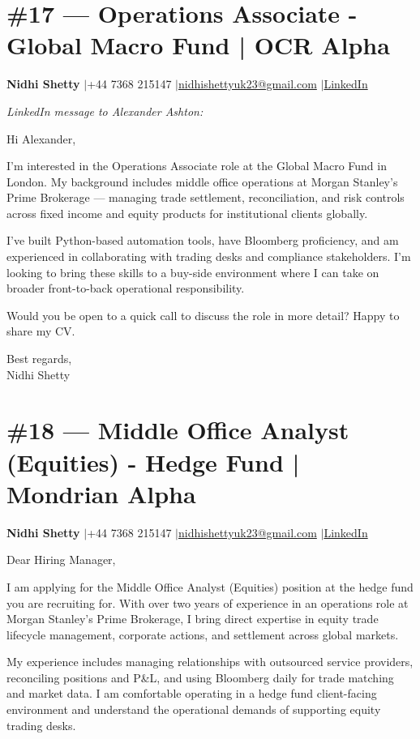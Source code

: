 \documentclass[11pt,a4paper]{article}
\makeatletter
\newcommand{\coverheader}{%
\begin{flushleft}
{\bfseries Nidhi Shetty} \enspace$\vert$\enspace +44 7368 215147 \enspace$\vert$\enspace \href{mailto:nidhishettyuk23@gmail.com}{nidhishettyuk23@gmail.com} \enspace$\vert$\enspace \href{https://www.linkedin.com/in/nidhi-shetty23-1841b7181}{LinkedIn}
\end{flushleft}
\vspace{4pt}
}
\makeatother
\begin{document}
\section{\#17 --- Operations Associate - Global Macro Fund | OCR Alpha}
\coverheader

\textit{LinkedIn message to Alexander Ashton:}

\vspace{6pt}

Hi Alexander,

I'm interested in the Operations Associate role at the Global Macro Fund in London. My background includes middle office operations at Morgan Stanley's Prime Brokerage --- managing trade settlement, reconciliation, and risk controls across fixed income and equity products for institutional clients globally.

I've built Python-based automation tools, have Bloomberg proficiency, and am experienced in collaborating with trading desks and compliance stakeholders. I'm looking to bring these skills to a buy-side environment where I can take on broader front-to-back operational responsibility.

Would you be open to a quick call to discuss the role in more detail? Happy to share my CV.

\vspace{8pt}
Best regards,\\
Nidhi Shetty

\newpage
\section{\#18 --- Middle Office Analyst (Equities) - Hedge Fund | Mondrian Alpha}
\coverheader

Dear Hiring Manager,

I am applying for the Middle Office Analyst (Equities) position at the hedge fund you are recruiting for. With over two years of experience in an operations role at Morgan Stanley's Prime Brokerage, I bring direct expertise in equity trade lifecycle management, corporate actions, and settlement across global markets.

My experience includes managing relationships with outsourced service providers, reconciling positions and P\&L, and using Bloomberg daily for trade matching and market data. I am comfortable operating in a hedge fund client-facing environment and understand the operational demands of supporting equity trading desks.
\end{document}
